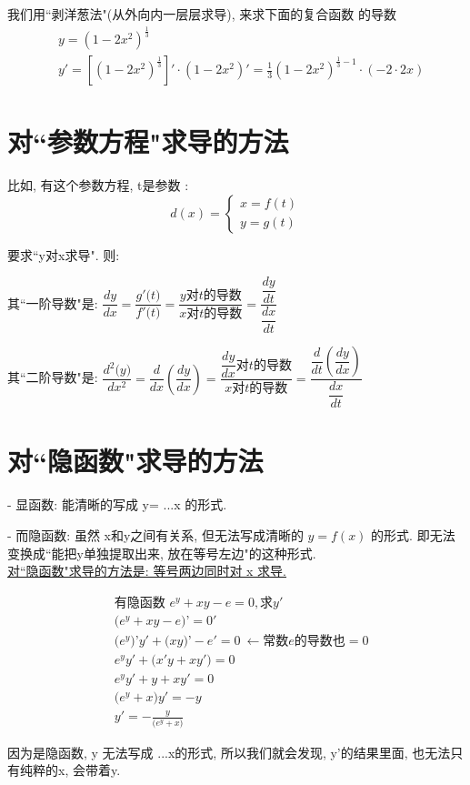 \documentclass[UTF8]{ctexart}
\newenvironment{myEnvSample}
{ 
	\begin{tcolorbox}[title = {例},boxrule={0.1em},colframe={black!10}, colback={black!3},colbacktitle={black!10},coltitle={black}]
		}
		{		
	\end{tcolorbox}
}
\begin{document}
\begin{myEnvSample}
	我们用``剥洋葱法"(从外向内一层层求导), 来求下面的复合函数 的导数
	\begin{align*}
		& y=\left( 1-2x^2 \right) ^{\frac{1}{3}} \\
		& y'=\left[ \left( 1-2x^2 \right) ^{\frac{1}{3}} \right] '\cdot \left( 1-2x^2 \right) '=\frac{1}{3}\left( 1-2x^2 \right) ^{\frac{1}{3}-1}\cdot \left( -2\cdot 2x \right) 		
	\end{align*}
\end{myEnvSample}




\section{对``参数方程"求导的方法}

比如, 有这个参数方程, t是参数 : 
\[ d(x)=
\begin{cases}
	x= f(t) \\
	y= g(t)
\end{cases}
\]

要求``y对x求导". 则:

其``一阶导数"是: $\dfrac{dy}{dx}=\dfrac{g'\text{(}t\text{)}}{f'\text{(}t\text{)}}=\dfrac{y\text{对}t\text{的导数}}{x\text{对}t\text{的导数}}=\dfrac{\dfrac{dy}{dt}}{\dfrac{dx}{dt}} $


其``二阶导数"是: $ \dfrac{d^2\text{(}y\text{)}}{dx^2}=\dfrac{d}{dx}\left( \dfrac{dy}{dx} \right) =\dfrac{\dfrac{dy}{dx}\text{对}t\text{的导数}}{x\text{对}t\text{的导数}}=\dfrac{\dfrac{d}{dt}\left( \dfrac{dy}{dx} \right)}{\dfrac{dx}{dt}} $




\section{对``隐函数"求导的方法}

- 显函数: 能清晰的写成 y= ...x 的形式.

- 而隐函数: 虽然 x和y之间有关系, 但无法写成清晰的 $ y=f(x)$ 的形式. 即无法变换成``能把y单独提取出来, 放在等号左边"的这种形式. \\

\underline{对``隐函数"求导的方法是: 等号两边同时对 x 求导.} \\

\begin{myEnvSample}
	\begin{align*}
	&\text{有隐函数\ }e^y+xy-e=0,\text{求}y'\\
&\text{(}e^y+xy-e\text{)'}=0'\\
&\text{(}e^y\text{)'}y'+\text{(}xy\text{)'}-e'=0\ \gets \text{常数}e\text{的导数也}=0\\
&e^yy'+\text{(}x'y+xy'\text{)}=0\\
&e^yy'+y+xy'=0\\
&\text{(}e^y+x\text{)}y'=-y\\
&y'=-\frac{y}{\text{(}e^y+x\text{)}}
	\end{align*} 

因为是隐函数, y 无法写成 ...x的形式, 所以我们就会发现, y'的结果里面, 也无法只有纯粹的x, 会带着y.
\end{myEnvSample}
\end{document}
